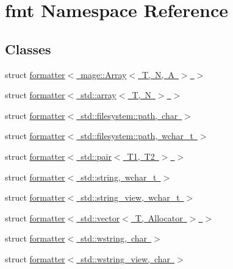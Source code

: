 \hypertarget{namespacefmt}{}\section{fmt Namespace Reference}
\label{namespacefmt}
\subsection*{Classes}
\begin{DoxyCompactItemize}
\item 
struct \mbox{\hyperlink{structfmt_1_1formatter_3_01mage_1_1_array_3_01_t_00_01_n_00_01_a_01_4_01_4}{formatter$<$ mage\+::\+Array$<$ T, N, A $>$ $>$}}
\item 
struct \mbox{\hyperlink{structfmt_1_1formatter_3_01std_1_1array_3_01_t_00_01_n_01_4_01_4}{formatter$<$ std\+::array$<$ T, N $>$ $>$}}
\item 
struct \mbox{\hyperlink{structfmt_1_1formatter_3_01std_1_1filesystem_1_1path_00_01char_01_4}{formatter$<$ std\+::filesystem\+::path, char $>$}}
\item 
struct \mbox{\hyperlink{structfmt_1_1formatter_3_01std_1_1filesystem_1_1path_00_01wchar__t_01_4}{formatter$<$ std\+::filesystem\+::path, wchar\+\_\+t $>$}}
\item 
struct \mbox{\hyperlink{structfmt_1_1formatter_3_01std_1_1pair_3_01_t1_00_01_t2_01_4_01_4}{formatter$<$ std\+::pair$<$ T1, T2 $>$ $>$}}
\item 
struct \mbox{\hyperlink{structfmt_1_1formatter_3_01std_1_1string_00_01wchar__t_01_4}{formatter$<$ std\+::string, wchar\+\_\+t $>$}}
\item 
struct \mbox{\hyperlink{structfmt_1_1formatter_3_01std_1_1string__view_00_01wchar__t_01_4}{formatter$<$ std\+::string\+\_\+view, wchar\+\_\+t $>$}}
\item 
struct \mbox{\hyperlink{structfmt_1_1formatter_3_01std_1_1vector_3_01_t_00_01_allocator_01_4_01_4}{formatter$<$ std\+::vector$<$ T, Allocator $>$ $>$}}
\item 
struct \mbox{\hyperlink{structfmt_1_1formatter_3_01std_1_1wstring_00_01char_01_4}{formatter$<$ std\+::wstring, char $>$}}
\item 
struct \mbox{\hyperlink{structfmt_1_1formatter_3_01std_1_1wstring__view_00_01char_01_4}{formatter$<$ std\+::wstring\+\_\+view, char $>$}}
\end{DoxyCompactItemize}
